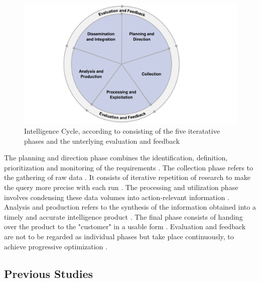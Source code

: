 \documentclass[10pt]{article}
\begin{document}
\begin{figure}[h]
    \centering
    \includegraphics[clip,width=0.8\linewidth]{PDF/images/crop_Intelligence Cycle}
    \caption{Intelligence Cycle, according to \cite{JointChiefsofStaffU.S.Army.2013} consisting of the five iteratative phases and the unterlying evaluation and feedback}
    \label{fig: Intelligence Cycle}
\end{figure}

The planning and direction phase combines the identification, definition, prioritization and monitoring
of the requirements \cite{JointChiefsofStaffU.S.Army.2013}.
The collection phase refers to the gathering of raw data \cite{CentralIntelligenceAgency.1987}.
It consists of iterative repetition of research
\cite{NorthAtlanticTreatyOrganization.2001} to make the query more precise with each run
\cite{PastorGalindo.2020}. The processing and utilization phase involves condensing
these data volumes into action-relevant information
\cite{JointChiefsofStaffU.S.Army.2013}.
Analysis and production refers to the synthesis of the information obtained into a timely and accurate intelligence product
\cite{Hwang.2022, NorthAtlanticTreatyOrganization.2001}.
The final phase consists of handing over the product to the "customer" in a
usable form \cite{CentralIntelligenceAgency.2023, Williams.2018}.
Evaluation and feedback are not to be regarded as individual phases
but take place continuously, to achieve progressive optimization
\cite{JointChiefsofStaffU.S.Army.2013, NorthAtlanticTreatyOrganization.2001}.

\subsection{Previous Studies}
\end{document}
